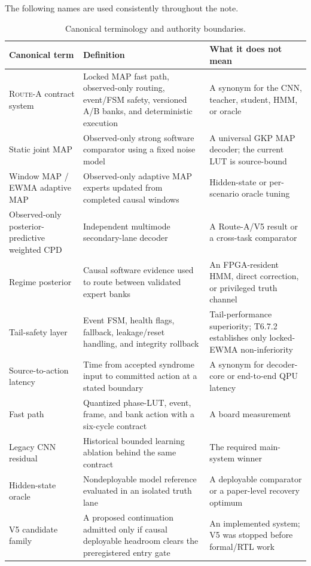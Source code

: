 \documentclass[11pt]{article}
\newcommand{\RouteA}{\textsc{Route-A}}
\begin{document}
The following names are used consistently throughout the note.

\begin{table}[htbp]
\centering
\small
\caption{Canonical terminology and authority boundaries.}
\label{tab:terminology}
\begin{tabularx}{\textwidth}{@{}L{0.22\textwidth} L{0.30\textwidth} Y@{}}
\toprule
Canonical term & Definition & What it does not mean \\
\midrule
\RouteA{} contract system & Locked MAP fast path, observed-only routing, event/FSM safety, versioned A/B banks, and deterministic execution & A synonym for the CNN, teacher, student, HMM, or oracle \\
Static joint MAP & Observed-only strong software comparator using a fixed noise model & A universal GKP MAP decoder; the current LUT is source-bound \\
Window MAP / EWMA adaptive MAP & Observed-only adaptive MAP experts updated from completed causal windows & Hidden-state or per-scenario oracle tuning \\
Observed-only posterior-predictive weighted CPD & Independent multimode secondary-lane decoder & A Route-A/V5 result or a cross-task comparator \\
Regime posterior & Causal software evidence used to route between validated expert banks & An FPGA-resident HMM, direct correction, or privileged truth channel \\
Tail-safety layer & Event FSM, health flags, fallback, leakage/reset handling, and integrity rollback & Tail-performance superiority; T6.7.2 establishes only locked-EWMA non-inferiority \\
Source-to-action latency & Time from accepted syndrome input to committed action at a stated boundary & A synonym for decoder-core or end-to-end QPU latency \\
Fast path & Quantized phase-LUT, event, frame, and bank action with a six-cycle contract & A board measurement \\
Legacy CNN residual & Historical bounded learning ablation behind the same contract & The required main-system winner \\
Hidden-state oracle & Nondeployable model reference evaluated in an isolated truth lane & A deployable comparator or a paper-level recovery optimum \\
V5 candidate family & A proposed continuation admitted only if causal deployable headroom clears the preregistered entry gate & An implemented system; V5 was stopped before formal/RTL work \\

\end{tabularx}
\end{table}
\end{document}
